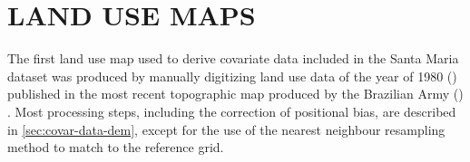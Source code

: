 \section{LAND USE MAPS}
\label{sec:covar-data-land-use}

The first land use map used to derive covariate data included in the Santa Maria dataset was produced by 
manually digitizing land use data of the year of \num{1980} (\landOld{}) published in the most recent 
topographic map produced by the Brazilian Army () \cite{DSG1992a, DSG1992}. Most processing 
steps, including the correction of positional bias, are described in \autoref{sec:covar-data-dem}, except for 
the use of the nearest neighbour resampling method to match \landOld{} to the reference grid.

%  
%   
%   
%     
%   
%   
